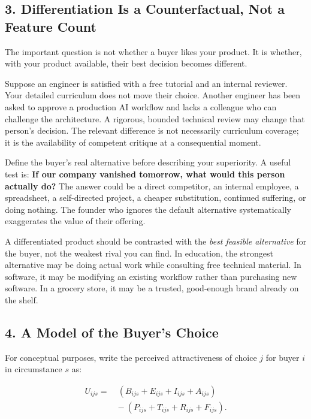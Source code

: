 \subsection*{3. Differentiation Is a Counterfactual, Not a Feature Count}

The important question is not whether a buyer likes your product. It is whether, with your product available, their best decision becomes different.

Suppose an engineer is satisfied with a free tutorial and an internal reviewer. Your detailed curriculum does not move their choice. Another engineer has been asked to approve a production AI workflow and lacks a colleague who can challenge the architecture. A rigorous, bounded technical review may change that person's decision. The relevant difference is not necessarily curriculum coverage; it is the availability of competent critique at a consequential moment.

Define the buyer's real alternative before describing your superiority. A useful test is: \textbf{If our company vanished tomorrow, what would this person actually do?} The answer could be a direct competitor, an internal employee, a spreadsheet, a self-directed project, a cheaper substitution, continued suffering, or doing nothing. The founder who ignores the default alternative systematically exaggerates the value of their offering.

A differentiated product should be contrasted with the \emph{best feasible alternative} for the buyer, not the weakest rival you can find. In education, the strongest alternative may be doing actual work while consulting free technical material. In software, it may be modifying an existing workflow rather than purchasing new software. In a grocery store, it may be a trusted, good-enough brand already on the shelf.

\subsection*{4. A Model of the Buyer's Choice}

For conceptual purposes, write the perceived attractiveness of choice $j$ for buyer $i$ in circumstance $s$ as:

\begin{equation}
\begin{aligned}
U_{ijs} =\ &(B_{ijs} + E_{ijs} + I_{ijs} + A_{ijs}) \\
&-\ (P_{ijs} + T_{ijs} + R_{ijs} + F_{ijs}).
\end{aligned}
\end{equation}

